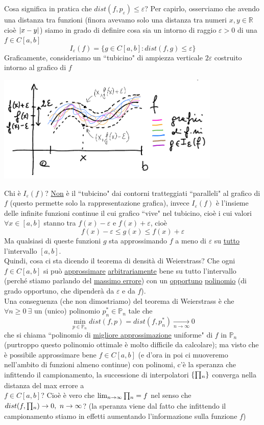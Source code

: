 Cosa significa in pratica che $dist(f,p_{\varepsilon}) \le \varepsilon$? Per capirlo, osserviamo che avendo una distanza tra funzioni (finora avevamo solo una distanza tra numeri $x,y \in \mathbb{R}$ cioè $\lvert x-y\rvert$) siamo in grado di definire cosa sia un intorno
di raggio $\varepsilon >0$ di una $f\in C[a,b]$
\[ I_{\varepsilon}(f) = \{g \in C[a,b] : dist(f,g) \le \varepsilon\} \]
Graficamente, consideriamo un ``tubicino" di ampiezza verticale $2\varepsilon$ costruito intorno al grafico di $f$
\begin{center}
    \includegraphics[width=0.8\textwidth]{foto/lez12_img3}
\end{center}
Chi è $I_{\varepsilon}(f)$? \uline{Non} è il ``tubicino" dai contorni tratteggiati ``paralleli" al grafico di $f$ (questo permette solo
la rappresentazione grafica), invece $I_{\varepsilon}(f)$ è l'insieme delle infinite funzioni continue il cui grafico ``vive" nel tubicino, cioè i cui valori $\forall x \in [a,b]$ stanno tra $f(x)-\varepsilon$ e $f(x)+\varepsilon$, cioè 
\[ f(x)-\varepsilon \le g(x) \le f(x)+\varepsilon \]
Ma qualsiasi di queste funzioni $g$ sta approssimando $f$ a meno di $\varepsilon$ su \uline{tutto} l'intervallo $[a,b]$.\\
Quindi, cosa ci sta dicendo il teorema di densità di Weierstrass? Che ogni $f \in C[a,b]$ si può \uline{approssimare} \uline{arbitrariamente} bene
su tutto l'intervallo (perché stiamo parlando del \uline{massimo errore}) con un \uline{opportuno} \uline{polinomio} (di grado opportuno, che dipenderà da $\varepsilon$ e da $f$).\\
Una conseguenza (che non dimostriamo) del teorema di Weierstrass è che $\forall n\ge0\ \exists$ un (unico) polinomio $p_n^* \in \mathbb{P}_n$ tale che
\[ \min_{p \in \mathbb{P}_n} dist(f,p) = dist(f,p_n^*) \underset{n \to \infty}{\longrightarrow} 0 \]
che si chiama ``polinomio di \uline{migliore approssimazione} uniforme" di $f$ in $\mathbb{P}_n$ (purtroppo questo polinomio ottimale
è molto difficile da calcolare); ma visto che è possibile approssimare bene $f \in C[a,b]$ (e d'ora in poi ci muoveremo nell'ambito di funzioni almeno continue) con polinomi, c'è la speranza che infittendo il campionamento, la successione di interpolatori $\{\begin{matrix}\prod\end{matrix}_n\}$ converga nella distanza del max errore a \\$f \in C[a,b]$? Cioè è vero che $\lim_{n \to \infty} \begin{matrix}\prod\end{matrix}_n = f$ nel senso che $dist(f,\begin{matrix}\prod\end{matrix}_n) \to 0,\ n \to \infty$? (la speranza viene dal fatto che infittendo il campionamento stiamo in effetti aumentando l'informazione sulla funzione $f$)\\
